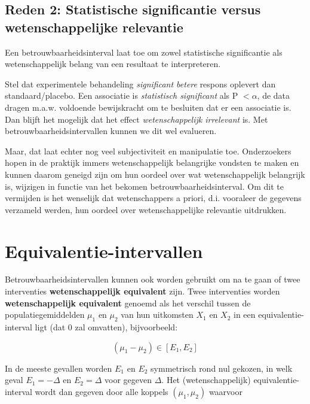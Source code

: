 \documentclass[
  12pt,dutch,coursenotes]{book}
\begin{document}
\hypertarget{reden-2-statistische-significantie-versus-wetenschappelijke-relevantie}{%
\subsection{Reden 2: Statistische significantie versus wetenschappelijke relevantie}\label{reden-2-statistische-significantie-versus-wetenschappelijke-relevantie}}

Een betrouwbaarheidsinterval laat toe om zowel statistische significantie als wetenschappelijk belang van een resultaat te interpreteren.

Stel dat experimentele behandeling \emph{significant betere} respons oplevert dan standaard/placebo.
Een associatie is \emph{statistisch significant} als P \(< \alpha\),
de data dragen m.a.w. voldoende bewijskracht om te besluiten dat er een associatie is. Dan blijft het mogelijk dat het effect \emph{wetenschappelijk irrelevant} is.
Met betrouwbaarheidsintervallen kunnen we dit wel evalueren.

Maar, dat laat echter nog veel subjectiviteit en manipulatie toe. Onderzoekers hopen in de praktijk immers wetenschappelijk belangrijke vondsten te maken en kunnen daarom geneigd zijn om hun oordeel over wat wetenschappelijk belangrijk is, wijzigen in functie van het bekomen betrouwbaarheidsinterval. Om dit te vermijden is het wenselijk dat wetenschappers a priori, d.i. vooraleer de gegevens verzameld werden, hun oordeel over wetenschappelijke relevantie uitdrukken.

\hypertarget{equivalentie-intervallen}{%
\section{Equivalentie-intervallen}\label{equivalentie-intervallen}}

Betrouwbaarheidsintervallen kunnen ook worden gebruikt om na te gaan of twee interventies \textbf{wetenschappelijk equivalent} zijn.
Twee interventies worden \textbf{wetenschappelijk equivalent} genoemd als het verschil tussen de populatiegemiddelden
\(\mu_1\) en \(\mu_2\) van hun uitkomsten \(X_1\) en \(X_2\) in een
equivalentie-interval ligt (dat 0 zal omvatten), bijvoorbeeld:

\begin{equation*}
(\mu_1 - \mu_2) \in [E_1, E_2]
\end{equation*}

In de meeste gevallen worden \(E_1\) en \(E_2\) symmetrisch rond nul gekozen, in
welk geval \(E_1=-\Delta\) en \(E_2=\Delta\) voor gegeven \(\Delta\). Het
(wetenschappelijk) equivalentie-interval wordt dan gegeven door alle koppels \((\mu_1,\mu_2)\) waarvoor
\end{document}
